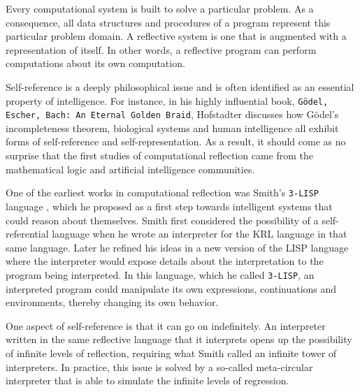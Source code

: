 Every computational system is built to solve a particular problem. As a consequence, all data structures and procedures
of a program represent this particular problem domain. A reflective system is one that is augmented with a representation
of itself. In other words, a reflective program can perform computations about its own computation.

Self-reference is a deeply philosophical issue and is often identified as an essential property of intelligence. For instance,
in his highly influential book, \texttt{Gödel, Escher, Bach: An Eternal Golden Braid}, Hofstadter \cite{Hofstadter} discusses how
Gödel's incompleteness theorem, biological systems and human intelligence all exhibit forms of self-reference and
self-representation. As a result, it should come as no surprise that the first studies of computational reflection came
from the mathematical logic and artificial intelligence communities.

One of the earliest works in computational reflection was Smith's \texttt{3-LISP} language \cite{Smith}, which he proposed as a first step towards
intelligent systems that could reason about themselves. Smith first considered the possibility of a self-referential language
when he wrote an interpreter for the KRL language in that same language. Later he refined his ideas in a new version of the
LISP language where the interpreter would expose details about the interpretation to the program being interpreted. In this language,
which he called \texttt{3-LISP}, an interpreted program could manipulate its own expressions, continuations and environments, thereby
changing its own behavior.

One aspect of self-reference is that it can go on indefinitely. An interpreter written in the same reflective language that it
interprets opens up the possibility of infinite levels of reflection, requiring what Smith called an infinite tower of interpreters.
In practice, this issue is solved by a so-called meta-circular interpreter that is able to simulate the infinite levels of regression.

